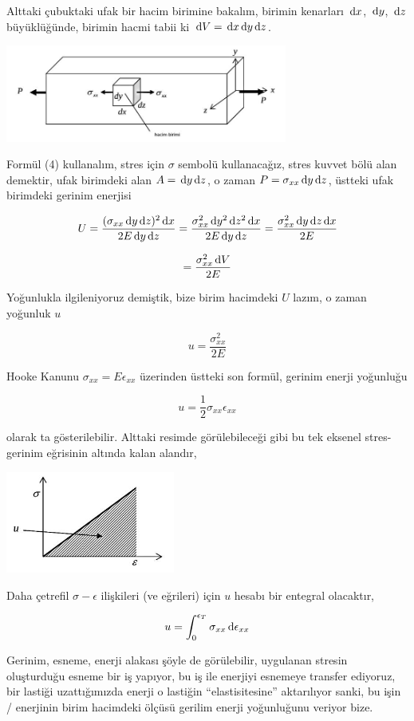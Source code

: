 \documentclass[12pt,fleqn]{article}\usepackage{../../common}
\begin{document}
Alttaki çubuktaki ufak bir hacim birimine bakalım, birimin kenarları $\,\mathrm{d} x$,
$\,\mathrm{d} y$, $\,\mathrm{d} z$ büyüklüğünde, birimin hacmi tabii ki $\,\mathrm{d} V = \,\mathrm{d} x \,\mathrm{d} y \,\mathrm{d}
z$.

\includegraphics[width=25em]{phy_020_strs_00_06.jpg}

Formül (4) kullanalım, stres için $\sigma$ sembolü kullanacağız, stres kuvvet
bölü alan demektir, ufak birimdeki alan $A = \,\mathrm{d} y \,\mathrm{d} z$, o zaman
$P = \sigma_{xx} \,\mathrm{d} y \,\mathrm{d} z$, üstteki ufak birimdeki gerinim enerjisi

$$
U = \frac{(\sigma_{xx} \,\mathrm{d} y \,\mathrm{d} z)^2 \,\mathrm{d} x}{2 E \,\mathrm{d} y \,\mathrm{d} z} =
\frac{\sigma_{xx}^2 \,\mathrm{d} y^2 \,\mathrm{d} z^2 \,\mathrm{d} x}{2 E \,\mathrm{d} y \,\mathrm{d} z} =
\frac{\sigma_{xx}^2 \,\mathrm{d} y \,\mathrm{d} z \,\mathrm{d} x}{2 E} 
$$

$$
= \frac{\sigma_{xx}^2 \,\mathrm{d} V}{2 E} 
$$

Yoğunlukla ilgileniyoruz demiştik, bize birim hacimdeki $U$ lazım, o zaman
yoğunluk $u$

$$
u = \frac{\sigma_{xx}^2}{2 E}
$$

Hooke Kanunu $\sigma_{xx} = E \epsilon_{xx}$ üzerinden üstteki son formül,
gerinim enerji yoğunluğu

$$
u = \frac{1}{2} \sigma_{xx} \epsilon_{xx}
$$

olarak ta gösterilebilir. Alttaki resimde görülebileceği gibi bu tek eksenel
stres-gerinim eğrisinin altında kalan alandır,

\includegraphics[width=15em]{phy_020_strs_00_09.jpg}

Daha çetrefil $\sigma-\epsilon$ ilişkileri (ve eğrileri) için $u$ hesabı
bir entegral olacaktır,

$$
u = \int_{0}^{\epsilon_{T}} \sigma_{xx} \,\mathrm{d} \epsilon_{xx} 
$$

Gerinim, esneme, enerji alakası şöyle de görülebilir, uygulanan stresin
oluşturduğu esneme bir iş yapıyor, bu iş ile enerjiyi esnemeye transfer
ediyoruz, bir lastiği uzattığımızda enerji o lastiğin ``elastisitesine''
aktarılıyor sanki, bu işin / enerjinin birim hacimdeki ölçüsü gerilim
enerji yoğunluğunu veriyor bize.
\end{document}
